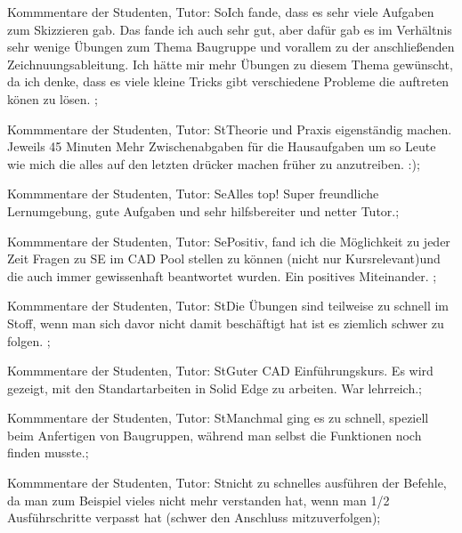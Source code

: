 \documentclass[10pt]{beamer}
\begin{document}
\begin{frame}[fragile]{Kommmentare der Studenten, Tutor: So}Ich fande, dass es sehr viele Aufgaben zum Skizzieren gab. Das fande ich auch sehr gut, aber dafür gab es im Verhältnis sehr wenige Übungen zum Thema Baugruppe und vorallem zu der anschließenden Zeichnuungsableitung. Ich hätte mir mehr Übungen zu diesem Thema gewünscht, da ich denke, dass es viele kleine Tricks gibt verschiedene Probleme die auftreten könen zu lösen. ;
 \end{frame}
\begin{frame}[fragile]{Kommmentare der Studenten, Tutor: St}Theorie und Praxis eigenständig machen.  Jeweils 45 Minuten   Mehr Zwischenabgaben für die Hausaufgaben um so Leute wie mich die alles auf den letzten drücker machen früher zu anzutreiben. :);
 \end{frame}
\begin{frame}[fragile]{Kommmentare der Studenten, Tutor: Se}Alles top! Super freundliche Lernumgebung, gute Aufgaben und sehr hilfsbereiter und netter Tutor.;
 \end{frame}
\begin{frame}[fragile]{Kommmentare der Studenten, Tutor: Se}Positiv, fand ich die Möglichkeit zu jeder Zeit Fragen zu SE im CAD Pool stellen zu können (nicht nur Kursrelevant)und die auch immer gewissenhaft beantwortet wurden.
 Ein positives Miteinander. ;
 \end{frame}
\begin{frame}[fragile]{Kommmentare der Studenten, Tutor: St}Die Übungen sind teilweise zu schnell im Stoff, wenn man sich davor nicht damit beschäftigt hat ist es ziemlich schwer zu folgen. ;
 \end{frame}
\begin{frame}[fragile]{Kommmentare der Studenten, Tutor: St}Guter CAD Einführungskurs. Es wird gezeigt, mit den Standartarbeiten in Solid Edge zu arbeiten. War lehrreich.;
 \end{frame}
\begin{frame}[fragile]{Kommmentare der Studenten, Tutor: St}Manchmal ging es zu schnell, speziell beim Anfertigen von Baugruppen, während man selbst die Funktionen noch finden musste.;
 \end{frame}
\begin{frame}[fragile]{Kommmentare der Studenten, Tutor: St}nicht zu schnelles ausführen der Befehle, da man zum Beispiel vieles nicht mehr verstanden hat, wenn man 1/2 Ausführschritte verpasst hat (schwer den Anschluss mitzuverfolgen);
 \end{frame}
\end{document}
